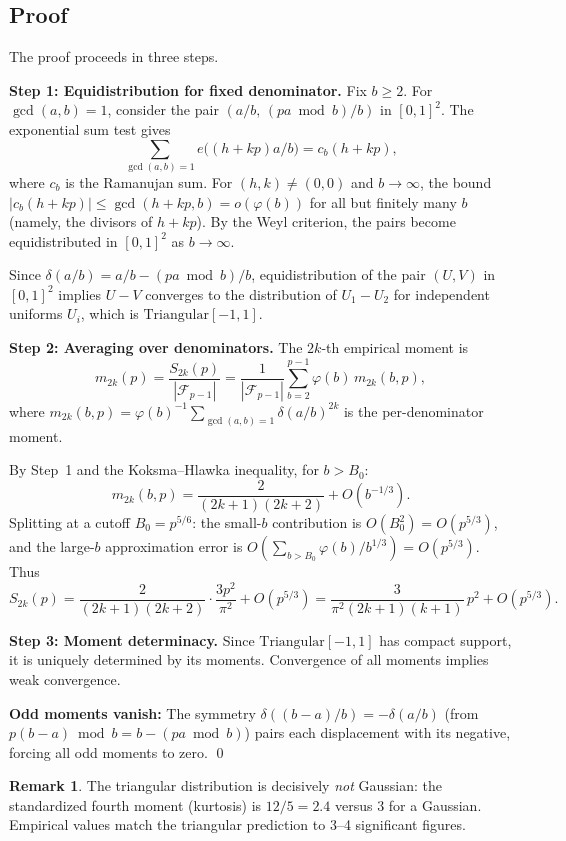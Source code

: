 \documentclass[11pt]{article}
\theoremstyle{definition}
\newtheorem{remark}[theorem]{Remark}
\newcommand{\F}{\mathcal{F}}
\begin{document}
\subsection{Proof}\label{sec:tri-proof}

The proof proceeds in three steps.

\smallskip
\noindent\textbf{Step 1: Equidistribution for fixed denominator.}
Fix $b \ge 2$.  For $\gcd(a,b) = 1$, consider the pair
$(a/b, \, (pa \bmod b)/b)$ in $[0,1]^2$.  The exponential sum
test gives
\[
  \sum_{\gcd(a,b)=1} e\bigl((h + kp)a/b\bigr) = c_b(h + kp),
\]
where $c_b$ is the Ramanujan sum.  For $(h,k) \ne (0,0)$ and
$b \to \infty$, the bound $|c_b(h + kp)| \le \gcd(h + kp, b) = o(\varphi(b))$
for all but finitely many $b$ (namely, the divisors of $h + kp$).
By the Weyl criterion, the pairs become equidistributed in
$[0,1]^2$ as $b \to \infty$.

Since $\delta(a/b) = a/b - (pa \bmod b)/b$, equidistribution of
the pair $(U, V)$ in $[0,1]^2$ implies $U - V$ converges to
the distribution of $U_1 - U_2$ for independent uniforms $U_i$,
which is $\mathrm{Triangular}[-1,1]$.

\smallskip
\noindent\textbf{Step 2: Averaging over denominators.}
The $2k$-th empirical moment is
\[
  m_{2k}(p) = \frac{S_{2k}(p)}{|\F_{p-1}|}
  = \frac{1}{|\F_{p-1}|}\sum_{b=2}^{p-1} \varphi(b)\, m_{2k}(b,p),
\]
where $m_{2k}(b,p) = \varphi(b)^{-1}\sum_{\gcd(a,b)=1}
\delta(a/b)^{2k}$ is the per-denominator moment.

By Step~1 and the Koksma--Hlawka inequality, for $b > B_0$:
\[
  m_{2k}(b,p) = \frac{2}{(2k+1)(2k+2)} + O(b^{-1/3}).
\]
Splitting at a cutoff $B_0 = p^{5/6}$: the small-$b$ contribution
is $O(B_0^2) = O(p^{5/3})$, and the large-$b$ approximation error
is $O(\sum_{b > B_0} \varphi(b)/b^{1/3}) = O(p^{5/3})$.  Thus
\[
  S_{2k}(p) = \frac{2}{(2k+1)(2k+2)} \cdot \frac{3p^2}{\pi^2}
    + O(p^{5/3})
  = \frac{3}{\pi^2(2k+1)(k+1)}\,p^2 + O(p^{5/3}).
\]

\smallskip
\noindent\textbf{Step 3: Moment determinacy.}
Since $\mathrm{Triangular}[-1,1]$ has compact support, it is
uniquely determined by its moments.  Convergence of all moments
implies weak convergence.

\smallskip
\noindent\textbf{Odd moments vanish:}
The symmetry $\delta((b-a)/b) = -\delta(a/b)$ (from
$p(b-a) \bmod b = b - (pa \bmod b)$) pairs each displacement
with its negative, forcing all odd moments to zero.
\qed

\begin{remark}
The triangular distribution is decisively \emph{not} Gaussian:
the standardized fourth moment (kurtosis) is $12/5 = 2.4$
versus $3$ for a Gaussian.  Empirical values match the triangular
prediction to 3--4 significant figures.
\end{remark}
\end{document}
